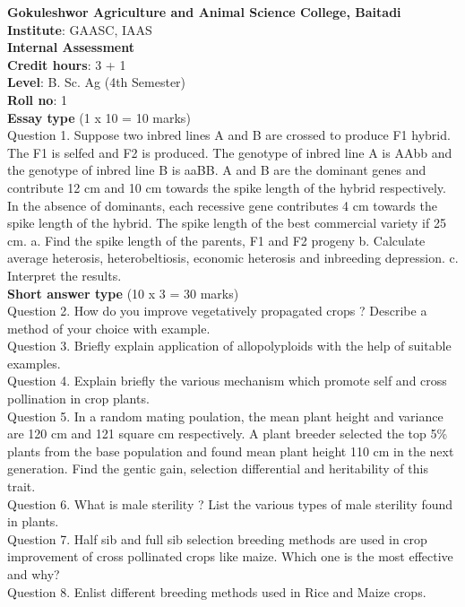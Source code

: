 \documentclass[12pt]{article}\usepackage[]{graphicx}\usepackage[]{color}
\begin{document}
{\centering \Large{\textbf{Gokuleshwor Agriculture and Animal Science College, Baitadi}} \\[0.25cm]
            \textbf{Institute}: GAASC, IAAS \\[0.2cm]
            \textbf{Internal Assessment} \\[0.2cm]} 
\textbf{Credit hours}: 3 + 1 \\ 
\textbf{Level}: B. Sc. Ag (4th Semester) \\
\textbf{Roll no}: 1 \\[0.5cm] 
\textbf{Essay type} (1 x 10 = 10 marks) \\
Question 1. Suppose two inbred lines A and B are crossed to produce F1 hybrid. The F1 is selfed and F2 is produced. The genotype of inbred line A is AAbb and the genotype of inbred line B is aaBB. A and B are the dominant genes and contribute 12 cm and 10 cm towards the spike length of the hybrid respectively. In the absence of dominants, each recessive gene contributes 4 cm towards the spike length of the hybrid. The spike length of the best commercial variety if 25 cm. a. Find the spike length of the parents, F1 and F2 progeny b. Calculate average heterosis, heterobeltiosis, economic heterosis and inbreeding depression. c. Interpret the results.\\
\textbf{Short answer type} (10 x 3 = 30 marks) \\
Question 2. How do you improve vegetatively propagated crops ? Describe a method of your choice with example.\\
Question 3. Briefly explain application of allopolyploids with the help of suitable examples.\\
Question 4. Explain briefly the various mechanism which promote self and cross pollination in crop plants.\\
Question 5. In a random mating poulation, the mean plant height and variance are 120 cm and 121 square cm respectively. A plant breeder selected the top 5\% plants from the base population and found mean plant height 110 cm in the next generation. Find the gentic gain, selection differential and heritability of this trait.\\
Question 6. What is male sterility ? List the various types of male sterility found in plants.\\
Question 7. Half sib and full sib selection breeding methods are used in crop improvement of cross pollinated crops like maize. Which one is the most effective and why?\\
Question 8. Enlist different breeding methods used in Rice and Maize crops.\\
\end{document}
